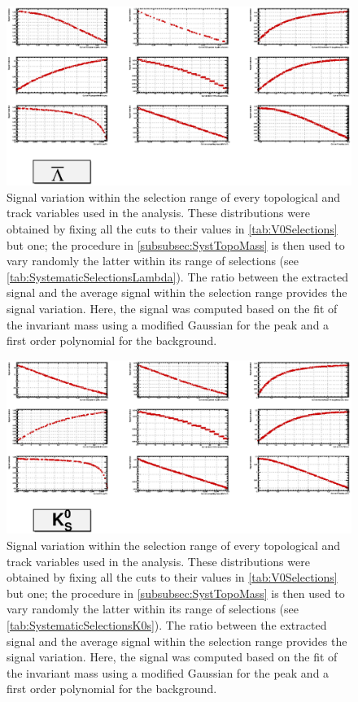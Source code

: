 \begin{landscape}
\begin{figure}[h]
	\centering
	\includegraphics[width=1.45\textwidth]{Figs/Chapter5/SignalVariation_AntiLambda.eps}
\caption{Signal variation within the selection range of every topological and track variables used in the \rmAlambda analysis. These distributions were obtained by fixing all the cuts to their values in \tab\ref{tab:V0Selections} but one; the procedure in \Sec\ref{subsubsec:SystTopoMass} is then used to vary randomly the latter within its range of selections (see \tab\ref{tab:SystematicSelectionsLambda}). The ratio between the extracted signal and the average signal within the selection range provides the signal variation. Here, the signal was computed based on the fit of the invariant mass using a modified Gaussian for the peak and a first order polynomial for the background.}
	\label{fig:SignalVariation_TopoSel_AntiLambda}
\end{figure}

\begin{figure}[h]
	\centering
	\includegraphics[width=1.45\textwidth]{Figs/Chapter5/SignalVariation_K0s.eps}
\caption{Signal variation within the selection range of every topological and track variables used in the \rmKzero analysis. These distributions were obtained by fixing all the cuts to their values in \tab\ref{tab:V0Selections} but one; the procedure in \Sec\ref{subsubsec:SystTopoMass} is then used to vary randomly the latter within its range of selections (see \tab\ref{tab:SystematicSelectionsK0s}). The ratio between the extracted signal and the average signal within the selection range provides the signal variation. Here, the signal was computed based on the fit of the invariant mass using a modified Gaussian for the peak and a first order polynomial for the background.}
	\label{fig:SignalVariation_TopoSel_K0s}
\end{figure}
\end{landscape}

